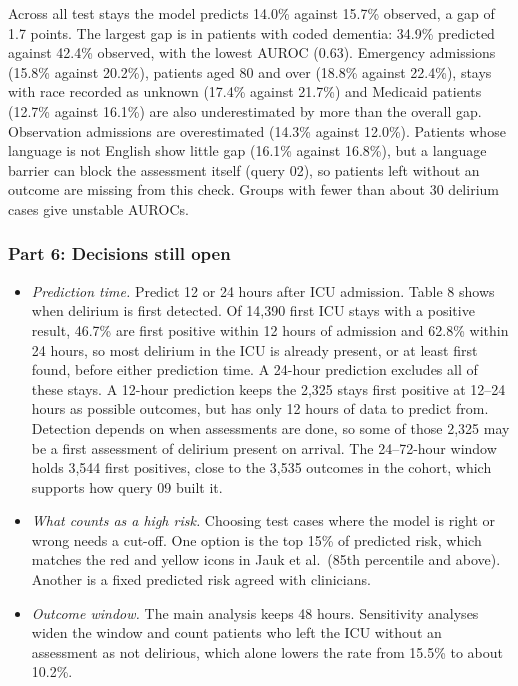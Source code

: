 \documentclass[10pt]{article}
\begin{document}
Across all test stays the model predicts 14.0\% against 15.7\% observed, a gap of 1.7 points. The largest gap is in patients with coded dementia: 34.9\% predicted against 42.4\% observed, with the lowest AUROC (0.63). Emergency admissions (15.8\% against 20.2\%), patients aged 80 and over (18.8\% against 22.4\%), stays with race recorded as unknown (17.4\% against 21.7\%) and Medicaid patients (12.7\% against 16.1\%) are also underestimated by more than the overall gap. Observation admissions are overestimated (14.3\% against 12.0\%). Patients whose language is not English show little gap (16.1\% against 16.8\%), but a language barrier can block the assessment itself (query 02), so patients left without an outcome are missing from this check. Groups with fewer than about 30 delirium cases give unstable AUROCs.



\subsubsection*{Part 6: Decisions still open}

\begin{itemize}
	\item \emph{Prediction time.} Predict 12 or 24 hours after ICU admission. Table 8 shows when delirium is first detected. Of 14,390 first ICU stays with a positive result, 46.7\% are first positive within 12 hours of admission and 62.8\% within 24 hours, so most delirium in the ICU is already present, or at least first found, before either prediction time. A 24-hour prediction excludes all of these stays. A 12-hour prediction keeps the 2,325 stays first positive at 12--24 hours as possible outcomes, but has only 12 hours of data to predict from. Detection depends on when assessments are done, so some of those 2,325 may be a first assessment of delirium present on arrival. The 24--72-hour window holds 3,544 first positives, close to the 3,535 outcomes in the cohort, which supports how query 09 built it.
	\item \emph{What counts as a high risk.} Choosing test cases where the model is right or wrong needs a cut-off. One option is the top 15\% of predicted risk, which matches the red and yellow icons in Jauk et al.\ (85th percentile and above). Another is a fixed predicted risk agreed with clinicians.
	\item \emph{Outcome window.} The main analysis keeps 48 hours. Sensitivity analyses widen the window and count patients who left the ICU without an assessment as not delirious, which alone lowers the rate from 15.5\% to about 10.2\%.
\end{itemize}
\end{document}

